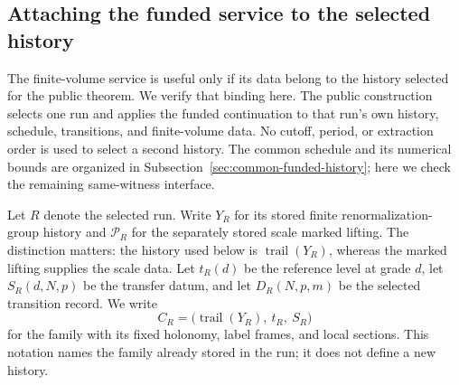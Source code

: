 \subsection{Attaching the funded service to the selected history}
\label{sec:original-history-portfolio-attachment}

The finite-volume service is useful only if its data belong to the history
selected for the public theorem. We verify that binding here. The public
construction selects one run and applies the funded continuation to that
run's own history, schedule, transitions, and finite-volume data. No cutoff,
period, or extraction order is used to select a second history. The common
schedule and its numerical bounds are organized in
Subsection~\ref{sec:common-funded-history}; here we check the remaining
same-witness interface.

Let $R$ denote the selected run. Write $Y_R$ for its stored finite
renormalization-group history and $\mathcal P_R$ for the separately stored
scale marked lifting.
The distinction matters: the history used below is
$\operatorname{trail}(Y_R)$, whereas the marked lifting supplies the scale data.
Let $t_R(d)$ be the reference level at grade $d$, let $S_R(d,N,p)$ be the
transfer datum, and let $D_R(N,p,m)$ be the selected transition record. We
write
\[
 C_R=\bigl(\operatorname{trail}(Y_R),\ t_R,\ S_R\bigr)
\]
for the family with its fixed holonomy, label frames, and local sections.
This notation names the family already stored in the run; it does not define
a new history.

